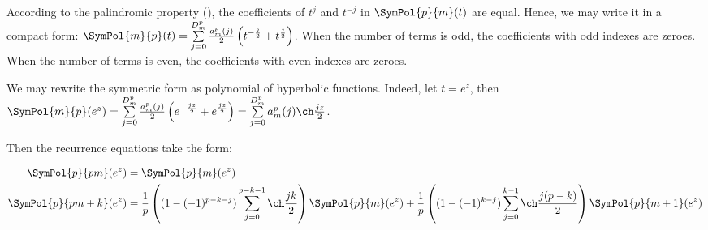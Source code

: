 

According to the palindromic property (), the coefficients of $t^j$ and $t^{-j}$ in $\SymPol{p}{m}(t)$ are equal. Hence, we may write it in a compact form: $\SymPol{m}{p}(t) = \sum\limits_{j=0}^{D_m^p} \frac{a_m^p(j)}{2} \left(t^{-\frac{j}{2}} + t^\frac{j}{2}\right)$. When the number of terms is odd, the coefficients with odd indexes are zeroes. When the number of terms is even, the coefficients with even indexes are zeroes.

We may rewrite the symmetric form as polynomial of hyperbolic functions. Indeed, let $t = e^z$, then $\SymPol{m}{p}(e^z) = \sum\limits_{j=0}^{D_m^p} \frac{a_m^p(j)}{2} \left(e^{-\frac{jz}{2}} + e^\frac{jz}{2}\right) = \sum\limits_{j=0}^{D_m^p} a_m^p(j) \ch \frac{jz}{2}$.

Then the recurrence equations take the form:

\begin{align}
    \SymPol{p}{pm}(e^z)&=\SymPol{p}{m}(e^z)\\
    \SymPol{p}{pm+k}(e^z)&=\frac{1}{p}\left((1-(-1)^{p-k-j})\sum\limits_{j=0}^{p-k-1} \ch\frac{jk}{2}\right)\SymPol{p}{m}(e^z)+\frac{1}{p}\left((1-(-1)^{k-j})\sum\limits_{j=0}^{k-1} \ch\frac{j(p-k)}{2}\right)\SymPol{p}{m+1}(e^z)
\end{align}